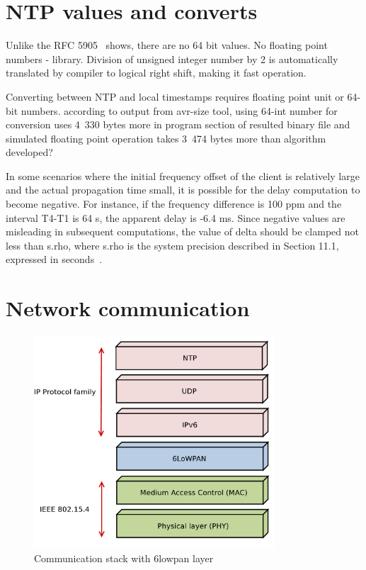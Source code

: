 

\section{NTP values and converts}
Unlike the RFC 5905~\cite{rfc5905} shows, there are no 64 bit values. %
No floating point numbers - library.
Division of unsigned integer number by 2 is automatically translated by compiler to logical right shift,
making it fast operation.

Converting between NTP and local timestamps requires floating point unit or 64-bit numbers.
according to output from avr-size tool, using 64-int number for conversion
uses 4~330 bytes more in program section of resulted binary file 
and simulated floating point operation takes 3~474 bytes more
than algorithm developed?

%
In some scenarios where the initial frequency offset of the client is
  relatively large and the actual propagation time small, it is
   possible for the delay computation to become negative.  For instance,
   if the frequency difference is 100 ppm and the interval T4-T1 is 64
   s, the apparent delay is -6.4 ms.  Since negative values are
   misleading in subsequent computations, the value of delta should be
   clamped not less than s.rho, where s.rho is the system precision
   described in Section 11.1, expressed in seconds~\cite{rfc5905}.
%

\section{Network communication}
\begin{figure}
  \centering
  \includegraphics[width=9cm,keepaspectratio]{fig/6lowpan.pdf}
  \caption{Communication stack with 6lowpan layer}
  \label{fig:implementation-6lowpan}
  \bigskip
\end{figure}

